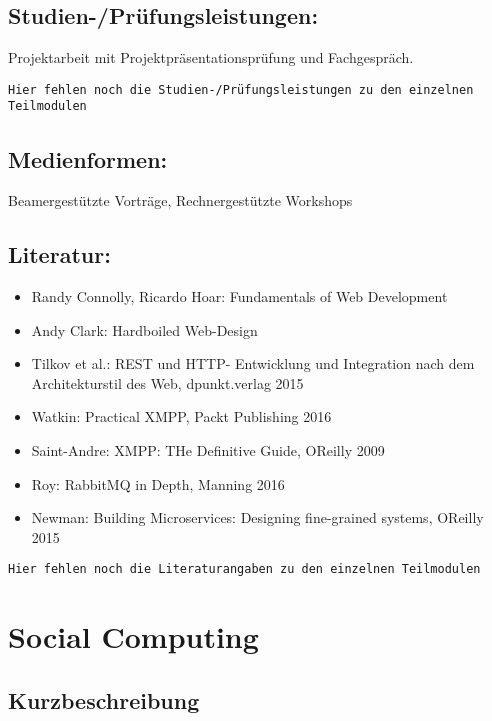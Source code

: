 \section{Studien-/Prüfungsleistungen:}\label{studien-pruxfcfungsleistungen-30}

Projektarbeit mit Projektpräsentationsprüfung und Fachgespräch.

\begin{verbatim}
Hier fehlen noch die Studien-/Prüfungsleistungen zu den einzelnen Teilmodulen
\end{verbatim}

\section{Medienformen:}\label{medienformen-30}

Beamergestützte Vorträge, Rechnergestützte Workshops

\section{Literatur:}\label{literatur-30}

\begin{itemize}
\tightlist
\item
  Randy Connolly, Ricardo Hoar: Fundamentals of Web Development
\item
  Andy Clark: Hardboiled Web-Design
\item
  Tilkov et al.: REST und HTTP- Entwicklung und Integration nach dem
  Architekturstil des Web, dpunkt.verlag 2015
\item
  Watkin: Practical XMPP, Packt Publishing 2016
\item
  Saint-Andre: XMPP: THe Definitive Guide, OReilly 2009
\item
  Roy: RabbitMQ in Depth, Manning 2016
\item
  Newman: Building Microservices: Designing fine-grained systems,
  OReilly 2015
\end{itemize}

\begin{verbatim}
Hier fehlen noch die Literaturangaben zu den einzelnen Teilmodulen
\end{verbatim}

\chapter{Social Computing}\label{social-computing}

\section{Kurzbeschreibung}\label{kurzbeschreibung-7}


